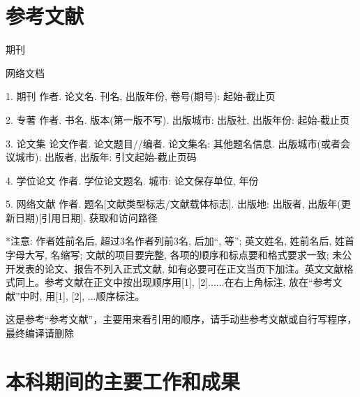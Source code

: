 \documentclass[utf8, a4paper, 12pt]{book}
\newcommand\clearemptydoublepage{\clearpage{\thispagestyle{empty}\cleardoublepage}}
\newcommand{\songti}{\CJKfamily{songti}}
\begin{document}
\chapter*{参考文献}
\begin{enumerate}[{[1]}]
\songti\fontsize{10.5pt}{10.5pt}\selectfont %
	\item 期刊
	\item 网络文档
\end{enumerate}

1.	期刊  作者. 论文名. 刊名, 出版年份, 卷号(期号): 起始-截止页

2.	专著  作者. 书名. 版本(第一版不写). 出版城市: 出版社, 出版年份: 起始-截止页

3.	论文集  论文作者. 论文题目//编者. 论文集名: 其他题名信息. 出版城市(或者会议城市): 出版者, 出版年: 引文起始-截止页码

4.	学位论文  作者. 学位论文题名. 城市: 论文保存单位, 年份

5.	网络文献  作者. 题名[文献类型标志/文献载体标志]. 出版地: 出版者, 出版年(更新日期)[引用日期]. 获取和访问路径

*注意: 作者姓前名后, 超过3名作者列前3名, 后加“, 等”; 英文姓名, 姓前名后, 姓首字母大写, 名缩写; 文献的项目要完整, 各项的顺序和标点要和格式要求一致; 未公开发表的论文、报告不列入正式文献, 如有必要可在正文当页下加注。英文文献格式同上。参考文献在正文中按出现顺序用[1], [2]......在右上角标注, 放在“参考文献”中时, 用[1], [2], ...顺序标注。



{
	\fancyhf{}
	\fancyfoot[RO,LE]{~\thepage~}
	\renewcommand{\headrulewidth}{0.7pt}
	\renewcommand{\footrulewidth}{0pt}
}
\fancyhf{}
\fancyfoot[RO,LE]{~\thepage~}
\renewcommand{\headrulewidth}{0.7pt}
\renewcommand{\footrulewidth}{0pt}
\clearemptydoublepage







这是参考“参考文献”，主要用来看引用的顺序，请手动些参考文献或自行写程序，最终编译请删除
\clearemptydoublepage




\chapter*{本科期间的主要工作和成果}
\songti\fontsize{12pt}{12pt}\selectfont %
\end{document}
